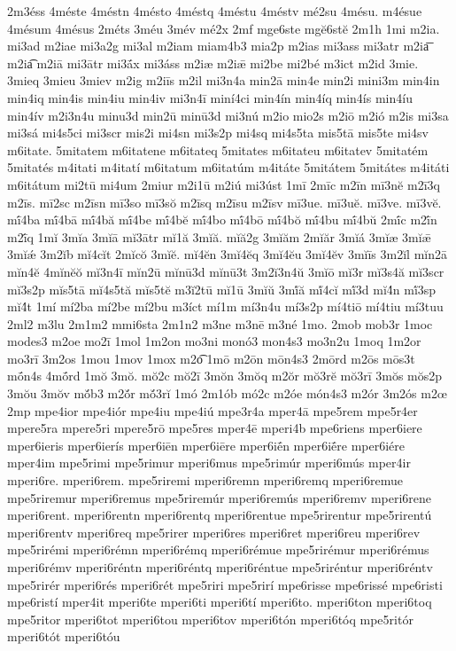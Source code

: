 {2m3éss
4méste
4méstn
4mésto
4méstq
4méstu
4méstv
mé2su
4mésu.
m4ésue
4mésum
4mésus
2méts
3méu
3mév
mé2x
2mf
mge6ste
mgĕ6stĕ
2m1h
1mi
m2ia.
mi3ad
m2iae
mi3a2g
mi3al
m2iam
miam4b3
mia2p
m2ias
mi3ass
mi3atr
m2ia͞
m2ia͡
m2iā
mi3ātr
mi3ā́x
mi3áss
m2iæ
m2iǣ
mi2be
mi2bé
m3ict
m2id
3mie.
3mieq
3mieu
3miev
m2ig
m2iīs
m2il
mi3n4a
min2ā
min4e
min2i
mini3m
min4in
min4iq
min4is
min4iu
min4iv
mi3n4ī
miní4ci
min4ín
min4íq
min4ís
min4íu
min4ív
m2i3n4u
minu3d
min2ū
minū3d
mi3nú
m2io
mio2s
m2iō
m2ió
m2is
mi3sa
mi3sá
mi4s5ci
mi3scr
mis2i
mi4sn
mi3s2p
mi4sq
mi4s5ta
mis5tā
mis5te
mi4sv
m6itate.
5mitatem
m6itatene
m6itateq
5mitates
m6itateu
m6itatev
5mitatém
5mitatés
m4itati
m4itatí
m6itatum
m6itatúm
m4itáte
5mitátem
5mitátes
m4itáti
m6itátum
mi2tū
mi4um
2miur
m2i1ū
m2iú
mi3úst
1mī
2mīc
m2īn
mī3nĕ
m2ī3q
m2īs.
mī2sc
m2īsn
mī3so
mī3sŏ
m2īsq
m2īsu
m2īsv
mī3ue.
mī3uĕ.
mī3ve.
mī3vĕ.
mī́4ba
mī́4bā
mī́4bă
mī́4be
mī́4bĕ
mī́4bo
mī́4bō
mī́4bŏ
mī́4bu
mī́4bŭ
2mī́c
m2ī́n
m2ī́q
1mĭ
3mĭa
3mĭā
mĭ3ātr
mĭ1ă
3mĭă.
mĭă2g
3mĭăm
2mĭăr
3mĭá
3mĭæ
3mĭǣ
3mĭǽ
3m2ĭb
mĭ4cĭt
2mĭcŏ
3mĭĕ.
mĭ4ĕn
3mĭ4ĕq
3mĭ4ĕu
3mĭ4ĕv
3mĭīs
3m2ĭl
mĭn2ā
mĭn4ĕ
4mĭnĕŏ
mĭ3n4ī
mĭn2ū
mĭnū3d
mĭnū3t
3m2ĭ3n4ŭ
3mĭō
mĭ3r
mĭ3s4ă
mĭ3scr
mĭ3s2p
mĭs5tā
mĭ4s5tă
mĭs5tĕ
m3ĭ2tū
mĭ1ū
3mĭŭ
3mĭ́ă
mĭ́4cĭ
mĭ́3d
mĭ4́n
mĭ́3sp
mĭ4́t
1mí
mí2ba
mí2be
mí2bu
m3íct
mí1m
mí3n4u
mí3s2p
mí4tiō
mí4tiu
mí3tuu
2ml2
m3lu
2m1m2
mmi6sta
2m1n2
m3ne
m3nē
m3né
1mo.
2mob
mob3r
1moc
modes3
m2oe
mo2ī
1mol
1m2on
mo3ni
monó3
mon4s3
mo3n2u
1moq
1m2or
mo3rī
3m2os
1mou
1mov
1mox
m2o͡
1mō
m2ōn
mōn4s3
2mōrd
m2ōs
mōs3t
mṓn4s
4mṓrd
1mŏ
3mŏ.
mŏ2c
mŏ2ī
3mŏn
3mŏq
m2ŏr
mŏ3rĕ
mŏ3rī
3mŏs
mŏs2p
3mŏu
3mŏv
mŏ́b3
m2ŏ́r
mŏ́3rĭ
1mó
2m1ób
mó2c
m2óe
món4s3
m2ór
3m2ós
m2œ
2mp
mpe4ior
mpe4iór
mpe4iu
mpe4iú
mpe3r4a
mper4ā
mpe5rem
mpe5r4er
mpere5ra
mpere5ri
mpere5rō
mpe5res
mper4ē
mperi4b
mpe6riens
mper6iere
mper6ieris
mper6ierís
mper6iēn
mper6iēre
mper6iḗn
mper6iḗre
mper6iére
mper4im
mpe5rimi
mpe5rimur
mperi6mus
mpe5rimúr
mperi6mús
mper4ir
mperi6re.
mperi6rem.
mpe5riremi
mperi6remn
mperi6remq
mperi6remue
mpe5riremur
mperi6remus
mpe5riremúr
mperi6remús
mperi6remv
mperi6rene
mperi6rent.
mperi6rentn
mperi6rentq
mperi6rentue
mpe5rirentur
mpe5rirentú
mperi6rentv
mperi6req
mpe5rirer
mperi6res
mperi6ret
mperi6reu
mperi6rev
mpe5rirémi
mperi6rémn
mperi6rémq
mperi6rémue
mpe5rirémur
mperi6rémus
mperi6rémv
mperi6réntn
mperi6réntq
mperi6réntue
mpe5riréntur
mperi6réntv
mpe5rirér
mperi6rés
mperi6rét
mpe5riri
mpe5rirí
mpe6risse
mpe6rissé
mpe6risti
mpe6ristí
mper4it
mperi6te
mperi6ti
mperi6tí
mperi6to.
mperi6ton
mperi6toq
mpe5ritor
mperi6tot
mperi6tou
mperi6tov
mperi6tón
mperi6tóq
mpe5ritór
mperi6tót
mperi6tóu
}

